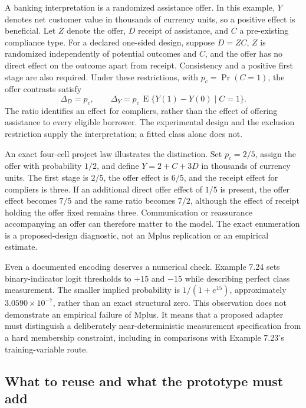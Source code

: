 A banking interpretation is a randomized assistance offer. In this
example, \(Y\) denotes net customer value in thousands of currency
units, so a positive effect is beneficial. Let \(Z\) denote the offer,
\(D\) receipt of assistance, and \(C\) a pre-existing compliance type.
For a declared one-sided design, suppose \(D=ZC\), \(Z\) is randomized
independently of potential outcomes and \(C\), and the offer has no
direct effect on the outcome apart from receipt. Consistency and a
positive first stage are also required. Under these restrictions, with
\(p_c=\Pr(C=1)\), the offer contrasts satisfy \[
 \Delta_D=p_c,\qquad
 \Delta_Y=p_c\,\operatorname{E}\{Y(1)-Y(0)\mid C=1\}.
\] The ratio identifies an effect for compliers, rather than the effect
of offering assistance to every eligible borrower. The experimental
design and the exclusion restriction supply the interpretation; a fitted
class alone does not.

An exact four-cell project law illustrates the distinction. Set
\(p_c=2/5\), assign the offer with probability \(1/2\), and define
\(Y=2+C+3D\) in thousands of currency units. The first stage is \(2/5\),
the offer effect is \(6/5\), and the receipt effect for compliers is
three. If an additional direct offer effect of \(1/5\) is present, the
offer effect becomes \(7/5\) and the same ratio becomes \(7/2\),
although the effect of receipt holding the offer fixed remains three.
Communication or reassurance accompanying an offer can therefore matter
to the model. The exact enumeration is a proposed-design diagnostic, not
an Mplus replication or an empirical estimate.
\citep{exec13_latent_examples}

Even a documented encoding deserves a numerical check. Example 7.24 sets
binary-indicator logit thresholds to \(+15\) and \(-15\) while
describing perfect class measurement. The smaller implied probability is
\(1/(1+e^{15})\), approximately \(3.0590\times10^{-7}\), rather than an
exact structural zero. This observation does not demonstrate an
empirical failure of Mplus. It means that a proposed adapter must
distinguish a deliberately near-deterministic measurement specification
from a hard membership constraint, including in comparisons with Example
7.23's training-variable route. \citep[pp.205--207]{exec13_latent_mplus,
exec13_latent_examples}

\hypertarget{what-to-reuse-and-what-the-prototype-must-add}{%
\subsection{What to reuse and what the prototype must
add}\label{what-to-reuse-and-what-the-prototype-must-add}}


